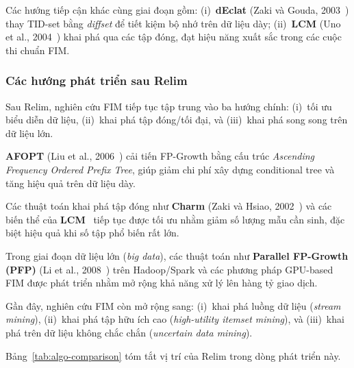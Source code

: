 \documentclass[12pt,a4paper]{report}
\begin{document}
\noindent
Các hướng tiếp cận khác cùng giai đoạn gồm:
(i)~\textbf{dEclat} (Zaki và Gouda, 2003~\cite{declat2003}) thay TID-set bằng \textit{diffset} để
tiết kiệm bộ nhớ trên dữ liệu dày;
(ii)~\textbf{LCM} (Uno et al., 2004~\cite{lcm2004}) khai phá qua các tập đóng, đạt hiệu năng xuất
sắc trong các cuộc thi chuẩn FIM.
 
\subsubsection{Các hướng phát triển sau Relim}

Sau Relim, nghiên cứu FIM tiếp tục tập trung vào ba hướng chính:
(i)~tối ưu biểu diễn dữ liệu,
(ii)~khai phá tập đóng/tối đại,
và
(iii)~khai phá song song trên dữ liệu lớn.

\noindent
\textbf{AFOPT} (Liu et al., 2006~\cite{afopt2006}) cải tiến FP-Growth bằng cấu trúc
\textit{Ascending Frequency Ordered Prefix Tree}, giúp giảm chi phí xây dựng
conditional tree và tăng hiệu quả trên dữ liệu dày.

\noindent
Các thuật toán khai phá tập đóng như \textbf{Charm} (Zaki và Hsiao,
2002~\cite{charm2002}) và các biến thể của \textbf{LCM}~\cite{lcm2004} tiếp tục
được tối ưu nhằm giảm số lượng mẫu cần sinh, đặc biệt hiệu quả khi số tập phổ
biến rất lớn.

\noindent
Trong giai đoạn dữ liệu lớn (\textit{big data}), các thuật toán như
\textbf{Parallel FP-Growth (PFP)} (Li et al., 2008~\cite{pfp2008}) trên
Hadoop/Spark và các phương pháp GPU-based FIM được phát triển nhằm mở rộng khả
năng xử lý lên hàng tỷ giao dịch.

\noindent
Gần đây, nghiên cứu FIM còn mở rộng sang:
(i)~khai phá luồng dữ liệu (\textit{stream mining}),
(ii)~khai phá tập hữu ích cao (\textit{high-utility itemset mining}),
và
(iii)~khai phá trên dữ liệu không chắc chắn (\textit{uncertain data mining}).
 
Bảng~\ref{tab:algo-comparison} tóm tắt vị trí của Relim trong dòng phát triển này.
 
\end{document}
